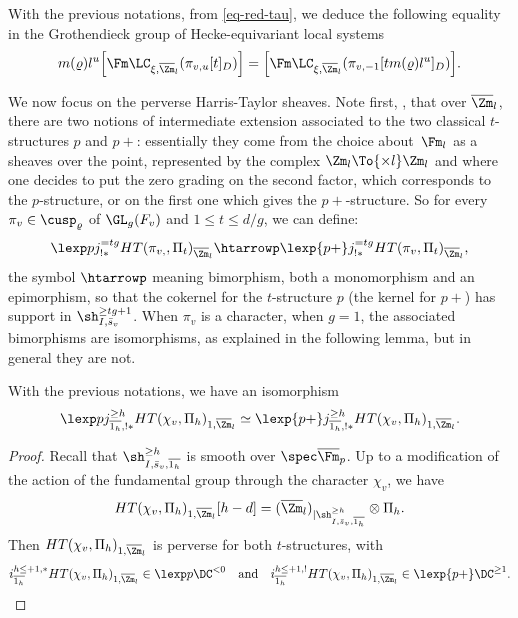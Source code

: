 With the previous notations, from \eqref{eq-red-tau}, we deduce the following equality in the
Grothendieck group of Hecke-equivariant local systems
\begin{equation} \label{eq-chgt-cuspi}
m(\varrho)l^{u}\Bigl [ \Fm \LC_{\xi,\overline \Zm_l}(\pi_{v,u}[t]_D) \Bigr ] =
\Bigl [ \Fm \LC_{\xi,\overline \Zm_l}(\pi_{v,-1}[tm(\varrho)l^u]_D) \Bigr ].
\end{equation}

We now focus on the perverse Harris-Taylor sheaves. Note first, \cf \cite[(2.2--2.4)]{juteau}, that over
$\overline \Zm_l$, there are two notions of intermediate extension associated to
the two classical $t$-structures $p$ and $p+$: essentially they come from
the choice about~$\Fm_l$ as a sheaves over the point, represented by the
complex $\Zm_l \To{\times l} \Zm_l$ and where one decides to
put the zero grading on the second factor, which corresponds to the $p$-structure, or on the first one which gives the $p+$-structure.
So for every $\pi_v \in \cusp_{\varrho}$ of $\GL_g(F_v)$ and $1 \leq t \leq d/g$, we can define:
\begin{equation} \label{eq-bimorphism}
\lexp p j^{=tg}_{!*} HT(\pi_{v,},\Pi_t)_{\overline \Zm_l} \htarrowp \lexp {p+} j^{=tg}_{!*} HT(\pi_{v},\Pi_t)_{\overline \Zm_l},
\end{equation}
the symbol $\htarrowp$ meaning bimorphism, \ie both a monomorphism and an epimorphism, so that
the cokernel for the $t$-structure $p$ (\resp the kernel for $p+$) has support in
$\sh^{\geq tg+1}_{I,\bar s_v}$. When $\pi_v$ is a character, \ie when $g=1$, the associated
bimorphisms are isomorphisms, as explained in the following lemma,
but in general they are not.

\begin{lemma} \label{lem-ext0}
With the previous notations, we have an isomorphism
\[
\lexp p j^{\geq h}_{\overline{1_h},!*} HT(\chi_v,\Pi_h)_{1,\overline \Zm_l}
\simeq \lexp {p+} j^{\geq h}_{\overline{1_h},!*} HT(\chi_v,\Pi_h)_{1,\overline \Zm_l}.
\]
\end{lemma}

\begin{proof}
Recall that $\sh^{\geq h}_{I,\bar s_v,\overline{1_h}}$ is smooth over
$\spec \overline \Fm_p$. Up to a modification of the action of the fundamental
group through the character $\chi_v$, we have
\[
HT(\chi_v,\Pi_h)_{1,\overline \Zm_l}[h-d]= (\overline \Zm_l)_{|\sh^{\geq h}_{I,\bar s_v,\overline{1_h}}} \otimes \Pi_h.
\]
Then $HT(\chi_v,\Pi_h)_{1,\overline \Zm_l}$ is perverse for both $t$-structures, with
\[
i^{h \leq +1,*}_{\overline{1_h}} HT(\chi_v,\Pi_h)_{1,\overline \Zm_l} \in
\lexp p \DC^{< 0} \quad\text{and}\quad
i^{h \leq +1,!}_{\overline{1_h}} HT(\chi_v,\Pi_h)_{1,\overline \Zm_l} \in
\lexp {p+} \DC^{\geq 1}.\qedhere
\]
\end{proof}

